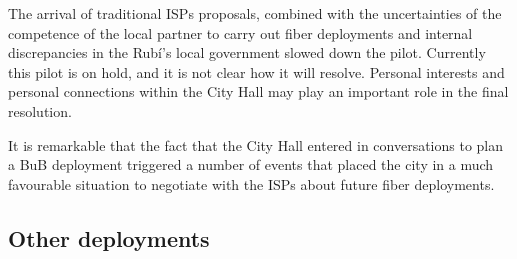 The arrival of traditional ISPs proposals, combined with the uncertainties of the competence of the local partner to carry out fiber deployments and internal discrepancies in the Rub\'{i}'s local government slowed down the pilot.
Currently this pilot is on hold, and it is not clear how it will resolve.
Personal interests and personal connections within the City Hall may play an important role in the final resolution.

It is remarkable that the fact that the City Hall entered in conversations to plan a BuB deployment triggered a number of events that placed the city in a much favourable situation to negotiate with the ISPs about future fiber deployments.

\subsection{Other deployments}

